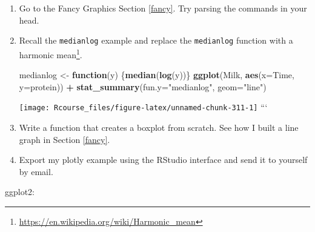 \documentclass[]{book}
\newenvironment{Shaded}{\begin{snugshade}}{\end{snugshade}}
\newcommand{\ControlFlowTok}[1]{\textcolor[rgb]{0.13,0.29,0.53}{\textbf{#1}}}
\newcommand{\DataTypeTok}[1]{\textcolor[rgb]{0.13,0.29,0.53}{#1}}
\newcommand{\KeywordTok}[1]{\textcolor[rgb]{0.13,0.29,0.53}{\textbf{#1}}}
\newcommand{\NormalTok}[1]{#1}
\newcommand{\OperatorTok}[1]{\textcolor[rgb]{0.81,0.36,0.00}{\textbf{#1}}}
\newcommand{\StringTok}[1]{\textcolor[rgb]{0.31,0.60,0.02}{#1}}
\renewcommand{\href}[2]{#2\footnote{\url{#1}}}
\theoremstyle{definition}
\theoremstyle{definition}
\theoremstyle{definition}
\theoremstyle{remark}
\begin{document}
\begin{enumerate}
\def\labelenumi{\arabic{enumi}.}
\item
  Go to the Fancy Graphics Section \ref{fancy}. Try parsing the commands in your head.
\item
  Recall the \texttt{medianlog} example and replace the \texttt{medianlog} function with a \href{https://en.wikipedia.org/wiki/Harmonic_mean}{harmonic mean}.

\begin{Shaded}
\begin{Highlighting}[]
\NormalTok{medianlog <-}\StringTok{ }\ControlFlowTok{function}\NormalTok{(y) \{}\KeywordTok{median}\NormalTok{(}\KeywordTok{log}\NormalTok{(y))\}}
\KeywordTok{ggplot}\NormalTok{(Milk, }\KeywordTok{aes}\NormalTok{(}\DataTypeTok{x=}\NormalTok{Time, }\DataTypeTok{y=}\NormalTok{protein)) }\OperatorTok{+}
\StringTok{  }\KeywordTok{stat_summary}\NormalTok{(}\DataTypeTok{fun.y=}\StringTok{"medianlog"}\NormalTok{, }\DataTypeTok{geom=}\StringTok{"line"}\NormalTok{)}
\end{Highlighting}
\end{Shaded}

  \texttt{[image: Rcourse\_files/figure-latex/unnamed-chunk-311-1]}
  ```
\item
  Write a function that creates a boxplot from scratch. See how I built a line graph in Section \ref{fancy}.
\item
  Export my plotly example using the RStudio interface and send it to yourself by email.
\end{enumerate}

ggplot2:
\end{document}
